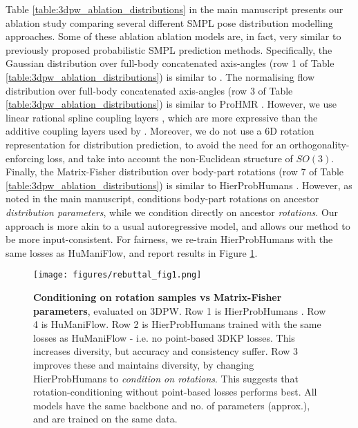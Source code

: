  Table \ref{table:3dpw_ablation_distributions} in the main manuscript presents our ablation study comparing several different SMPL pose distribution modelling approaches. Some of these ablation ablation models are, in fact, very similar to previously proposed probabilistic SMPL prediction methods. Specifically, the Gaussian distribution over full-body concatenated axis-angles (row 1 of Table \ref{table:3dpw_ablation_distributions}) is similar to \cite{sengupta2021probabilisticposeshape}. The normalising flow distribution over full-body concatenated axis-angles (row 3 of Table \ref{table:3dpw_ablation_distributions}) is similar to ProHMR \cite{kolotouros2021prohmr}. However, we use linear rational spline coupling layers \cite{dolatabadi2020lrs}, which are more expressive than the additive coupling layers \cite{dinh2015nice} used by \cite{kolotouros2021prohmr}. Moreover, we do not use a 6D rotation representation \cite{Zhou_2019_CVPR} for distribution prediction, to avoid the need for an orthogonality-enforcing loss, and take into account the non-Euclidean structure of $SO(3)$. Finally, the Matrix-Fisher distribution over body-part rotations (row 7 of Table \ref{table:3dpw_ablation_distributions}) is similar to HierProbHumans \cite{sengupta2021hierprobhuman}. However, as noted in the main manuscript, \cite{sengupta2021hierprobhuman} conditions body-part rotations on ancestor \textit{distribution parameters}, while we condition directly on ancestor \textit{rotations}. Our approach is more akin to a usual autoregressive model, and allows our method to be more input-consistent. For fairness, we re-train HierProbHumans with the same losses as HuManiFlow, and report results in Figure \ref{fig:supmat_rebuttal_param_vs_rot_cond}. 

\begin{figure}[t!]
    \centering
    \texttt{[image: figures/rebuttal\_fig1.png]}
    \caption{\textbf{Conditioning on rotation samples vs Matrix-Fisher parameters}, evaluated on 3DPW. Row 1 is HierProbHumans \cite{sengupta2021hierprobhuman}. Row 4 is HuManiFlow. Row 2 is HierProbHumans trained with the same losses as HuManiFlow - i.e. no point-based 3DKP losses. This increases diversity, but accuracy and consistency suffer. Row 3 improves these and maintains diversity, by changing HierProbHumans to \textit{condition on rotations}. This suggests that rotation-conditioning without point-based losses performs best. All models have the same backbone and no. of parameters (approx.), and are trained on the same data.}
    \vspace{-0.1in}
    \label{fig:supmat_rebuttal_param_vs_rot_cond}
\end{figure}


